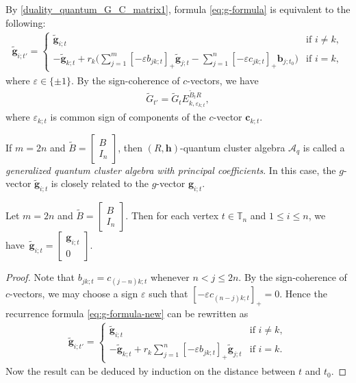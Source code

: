 By \eqref{duality_quantum_G_C_matrix1}, formula \eqref{eq:g-formula} is equivalent to the following:
 \begin{align}\label{eq:g-formula-new}
 \mathbf{\tilde{g}}_{i;t'}=
 \begin{cases}
 \mathbf{\tilde{g}}_{i;t} & \text{if } i\neq k,\\
 \displaystyle -\mathbf{\tilde{g}}_{k;t}+r_{k}\biggl(\sum\limits_{j=1}^{m}[-\varepsilon b_{jk;t}]_+\mathbf{\tilde{g}}_{j;t}-\sum\limits_{j=1}^{n}[-\varepsilon c_{jk;t}]_+\mathbf{b}_{j;t_0}\biggr) & \text{if }i=k,
 \end{cases}
 \end{align}
 where $\varepsilon\in\{\pm 1\}$.
By the sign-coherence of $c$-vectors, we have
\begin{align}\label{eq:g-matrix}
 \tilde{G}_{t'}=\tilde{G}_{t}E_{k,\varepsilon_{k;t}}^{\tilde{B}_{t}R},
\end{align}
where $\varepsilon_{k;t}$ is common sign of components of the $c$-vector $\mathbf{c}_{k;t}$.

If $m=2n$ and $\tilde{B}=\left[\begin{smallmatrix}
 B\\ I_n
 \end{smallmatrix}\right]$, then $(R,\mathbf{h})$-quantum cluster algebra $\mathcal{A}_q$ is called a {\it generalized quantum cluster algebra with principal coefficients}. In this case, the $g$-vector $\tilde{\mathbf{g}}_{i;t}$ is closely related to the $g$-vector $\mathbf{g}_{i;t}$.
\begin{Lemma}\label{l:g-vector-comparison}
 Let $m=2n$ and $\tilde{B}=\left[\begin{smallmatrix}
 B\\ I_n
 \end{smallmatrix}\right]$. Then for each vertex $t\in \mathbb{T}_n$ and $1\leq i\leq n$, we have~${\tilde{\mathbf{g}}_{i;t}=\left[\begin{smallmatrix}
 \mathbf{g}_{i;t}\\ 0
 \end{smallmatrix}\right]}$.
\end{Lemma}
\begin{proof}
 Note that $b_{jk;t}=c_{(j-n)k;t}$ whenever $n<j\leq 2n$. By the sign-coherence of $c$-vectors, we may choose a sign $\varepsilon$ such that $[-\varepsilon c_{(n-j)k;t}]_+=0$. Hence the recurrence formula \eqref{eq:g-formula-new} can be rewritten as
 \begin{align*}
 \tilde{\mathbf{g}}_{i;t'}= \begin{cases}
 \mathbf{\tilde{g}}_{i;t} & \text{if } i\neq k,\\
 \displaystyle-\mathbf{\tilde{g}}_{k;t}+r_{k}\sum\limits_{j=1}^{n}[-\varepsilon b_{jk;t}]_+\mathbf{\tilde{g}}_{j;t} & \text{if }i=k.
 \end{cases}
 \end{align*}
 Now the result can be deduced by induction on the distance between $t$ and $t_0$.
\end{proof}

